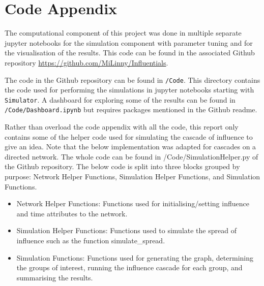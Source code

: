 \documentclass[10pt, oneside, reqno]{amsart}
\theoremstyle{plain}%
\theoremstyle{definition}
\theoremstyle{remark}
\begin{document}
\newpage



\section*{Code Appendix}

The computational component of this project was done in multiple separate jupyter notebooks for the simulation component with parameter tuning and for the visualisation of the results.
This code can be found in the associated Github repository \url{https://github.com/MiLinny/Influentials}.

The code in the Github repository can be found in \texttt{/Code}.
This directory contains the code used for performing the simulations in jupyter notebooks starting with \texttt{Simulator}.
A dashboard for exploring some of the results can be found in \texttt{/Code/Dashboard.ipynb} but requires packages mentioned in the Github readme. 

Rather than overload the code appendix with all the code, this report only contains some of the helper code used for simulating the cascade of influence to give an idea. 
Note that the below implementation was adapted for cascades on a directed network. 
The whole code can be found in /Code/SimulationHelper.py of the Github repository.
The below code is split into three blocks grouped by purpose: Network Helper Functions, Simulation Helper Functions, and Simulation Functions.

\begin{itemize}
    \item Network Helper Functions: Functions used for initialising/setting influence and time attributes to the network.
    \item Simulation Helper Functions: Functions used to simulate the spread of influence such as the function simulate\_spread.
    \item Simulation Functions: Functions used for generating the graph, determining the groups of interest, running the influence cascade for each group, and summarising the results.
\end{itemize}
\end{document}
